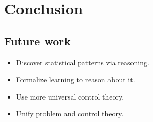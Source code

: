 \documentclass[aspectratio=169]{beamer}
\begin{document}
\section{Conclusion}
\subsection{Future work}




\begin{frame}
  \begin{itemize}
  \item Discover statistical patterns via reasoning.
  \item Formalize learning to reason about it.
  \item Use more universal control theory.
  \item Unify problem and control theory.
  \end{itemize}

  \vphantom{}\\[2cm]

  \begin{center}
    \color{dblue}{metta-lang.dev}\\
    \color{dblue}{github.com/trueagi-io/chaining}
  \end{center}
\end{frame}
\end{document}
